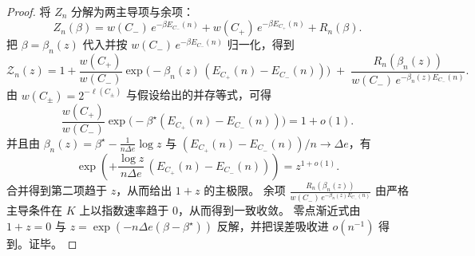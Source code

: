 \begin{proof}
将 \(Z_n\) 分解为两主导项与余项：
\[
Z_n(\beta)=w(C_-)\,e^{-\beta E_{C_-}(n)}+w(C_+)\,e^{-\beta E_{C_+}(n)}+R_n(\beta).
\]
把 \(\beta=\beta_n(z)\) 代入并按 \(w(C_-)\,e^{-\beta E_{C_-}(n)}\) 归一化，得到
\[
\mathcal Z_n(z)=1+\frac{w(C_+)}{w(C_-)}\exp\!\bigl(-\beta_n(z)\,(E_{C_+}(n)-E_{C_-}(n))\bigr)
\;+\;\frac{R_n(\beta_n(z))}{w(C_-)\,e^{-\beta_n(z)E_{C_-}(n)}}.
\]
由 \(w(C_\pm)=2^{-\ell(C_\pm)}\) 与假设给出的并存等式，可得
\[
\frac{w(C_+)}{w(C_-)}\exp\!\bigl(-\beta^\star(E_{C_+}(n)-E_{C_-}(n))\bigr)=1+o(1).
\]
并且由 \(\beta_n(z)=\beta^\star-\frac{1}{n\Delta e}\log z\) 与 \((E_{C_+}(n)-E_{C_-}(n))/n\to \Delta e\)，有
\[
\exp\!\left(+\frac{\log z}{n\Delta e}\,(E_{C_+}(n)-E_{C_-}(n))\right)=z^{1+o(1)}.
\]
合并得到第二项趋于 \(z\)，从而给出 \(1+z\) 的主极限。
余项 \(\frac{R_n(\beta_n(z))}{w(C_-)\,e^{-\beta_n(z)E_{C_-}(n)}}\) 由严格主导条件在 \(K\) 上以指数速率趋于 \(0\)，从而得到一致收敛。
零点渐近式由 \(1+z=0\) 与 \(z=\exp(-n\Delta e(\beta-\beta^\star))\) 反解，并把误差吸收进 \(o(n^{-1})\) 得到。证毕。
\end{proof}

